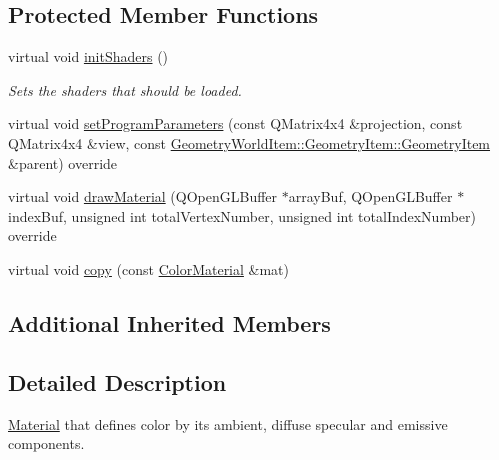 \subsection*{Protected Member Functions}
\begin{DoxyCompactItemize}
\item 
\mbox{\label{class_geometry_engine_1_1_geometry_material_1_1_color_material_ac0997ea93130c3fc270327948083059d}} 
virtual void \mbox{\hyperlink{class_geometry_engine_1_1_geometry_material_1_1_color_material_ac0997ea93130c3fc270327948083059d}{init\+Shaders}} ()
\begin{DoxyCompactList}\small\item\em Sets the shaders that should be loaded. \end{DoxyCompactList}\item 
virtual void \mbox{\hyperlink{class_geometry_engine_1_1_geometry_material_1_1_color_material_afc9bcbd2091f6592dfb8a6ace1d4adfb}{set\+Program\+Parameters}} (const Q\+Matrix4x4 \&projection, const Q\+Matrix4x4 \&view, const \mbox{\hyperlink{class_geometry_engine_1_1_geometry_world_item_1_1_geometry_item_1_1_geometry_item}{Geometry\+World\+Item\+::\+Geometry\+Item\+::\+Geometry\+Item}} \&parent) override
\item 
virtual void \mbox{\hyperlink{class_geometry_engine_1_1_geometry_material_1_1_color_material_abaf6f7ed79dad79253ea469c4c7460eb}{draw\+Material}} (Q\+Open\+G\+L\+Buffer $\ast$array\+Buf, Q\+Open\+G\+L\+Buffer $\ast$index\+Buf, unsigned int total\+Vertex\+Number, unsigned int total\+Index\+Number) override
\item 
virtual void \mbox{\hyperlink{class_geometry_engine_1_1_geometry_material_1_1_color_material_a11ddb849641dc6216d7ded2331636d46}{copy}} (const \mbox{\hyperlink{class_geometry_engine_1_1_geometry_material_1_1_color_material}{Color\+Material}} \&mat)
\end{DoxyCompactItemize}
\subsection*{Additional Inherited Members}


\subsection{Detailed Description}
\mbox{\hyperlink{class_geometry_engine_1_1_geometry_material_1_1_material}{Material}} that defines color by its ambient, diffuse specular and emissive components. 


